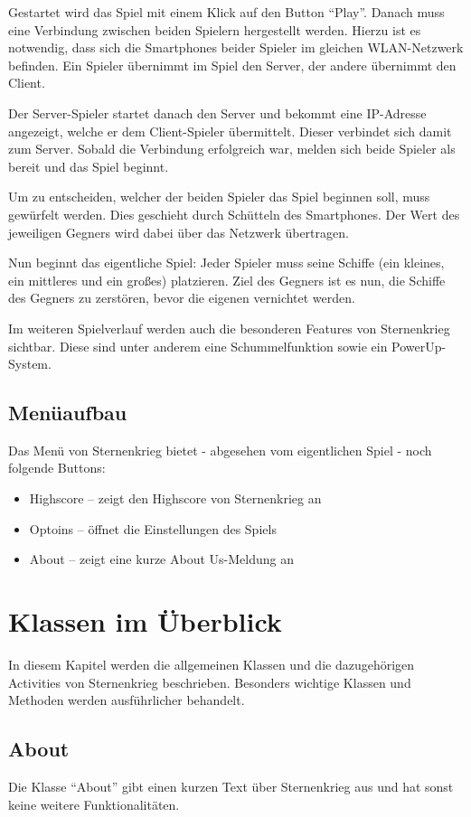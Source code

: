 \documentclass[11pt]{article} %
\begin{document}
Gestartet wird das Spiel mit einem Klick auf den Button \enquote{Play}. Danach muss eine Verbindung zwischen beiden Spielern hergestellt werden. Hierzu ist es notwendig, dass sich die Smartphones beider Spieler im gleichen WLAN-Netzwerk befinden. Ein Spieler übernimmt im Spiel den Server, der andere übernimmt den Client.

Der Server-Spieler startet danach den Server und bekommt eine IP-Adresse angezeigt, welche er dem Client-Spieler übermittelt. Dieser verbindet sich damit zum Server. Sobald die Verbindung erfolgreich war, melden sich beide Spieler als bereit und das Spiel beginnt.

Um zu entscheiden, welcher der beiden Spieler das Spiel beginnen soll, muss gewürfelt werden. Dies geschieht durch Schütteln des Smartphones. Der Wert des jeweiligen Gegners wird dabei über das Netzwerk übertragen.

Nun beginnt das eigentliche Spiel: Jeder Spieler muss seine Schiffe (ein kleines, ein mittleres und ein großes) platzieren. Ziel des Gegners ist es nun, die Schiffe des Gegners zu zerstören, bevor die eigenen vernichtet werden.

Im weiteren Spielverlauf werden auch die besonderen Features von Sternenkrieg sichtbar. Diese sind unter anderem eine Schummelfunktion sowie ein PowerUp-System.

\subsection{Menüaufbau}
Das Menü von Sternenkrieg bietet - abgesehen vom eigentlichen Spiel - noch folgende Buttons:
\begin{itemize}
\item Highscore -- zeigt den Highscore von Sternenkrieg an
\item Optoins -- öffnet die Einstellungen des Spiels
\item About -- zeigt eine kurze About Us-Meldung an
\end{itemize}


\section{Klassen im Überblick}
In diesem Kapitel werden die allgemeinen Klassen und die dazugehörigen Activities von Sternenkrieg beschrieben. Besonders wichtige Klassen und Methoden werden ausführlicher behandelt.

\subsection{About}
Die Klasse \enquote{About} gibt einen kurzen Text über Sternenkrieg aus und hat sonst keine weitere Funktionalitäten.
\end{document}
